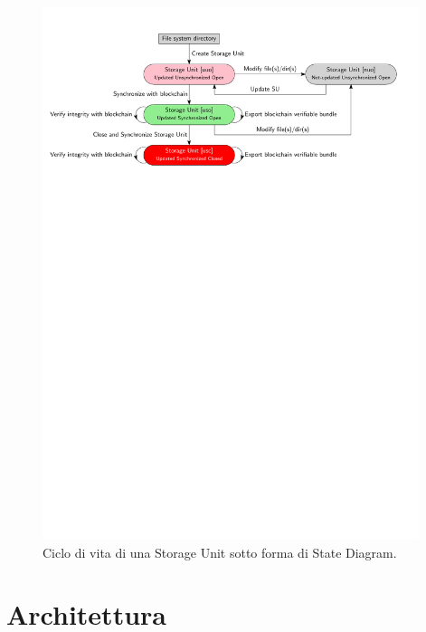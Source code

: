 \begin{figure}[H]
    \centering
    \includegraphics[width=0.98\textwidth]{Figures/stateDiag2}
    \caption{\small{
    Ciclo di vita di una Storage Unit sotto forma di State Diagram.
    } %
    } %
    \label{fi:stateDiag}
\end{figure}

\section {Architettura}

